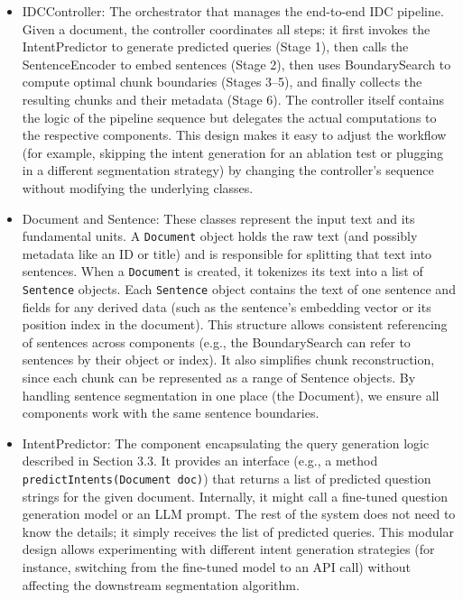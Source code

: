 \documentclass[12pt,a4paper]{report}
\begin{document}
\begin{itemize}
\item IDCController: The orchestrator that manages the end-to-end IDC pipeline. Given a document, the controller coordinates all steps: it first invokes the IntentPredictor to generate predicted queries (Stage 1), then calls the SentenceEncoder to embed sentences (Stage 2), then uses BoundarySearch to compute optimal chunk boundaries (Stages 3--5), and finally collects the resulting chunks and their metadata (Stage 6). The controller itself contains the logic of the pipeline sequence but delegates the actual computations to the respective components. This design makes it easy to adjust the workflow (for example, skipping the intent generation for an ablation test or plugging in a different segmentation strategy) by changing the controller's sequence without modifying the underlying classes.

\item Document and Sentence: These classes represent the input text and its fundamental units. A \texttt{Document} object holds the raw text (and possibly metadata like an ID or title) and is responsible for splitting that text into sentences. When a \texttt{Document} is created, it tokenizes its text into a list of \texttt{Sentence} objects. Each \texttt{Sentence} object contains the text of one sentence and fields for any derived data (such as the sentence's embedding vector or its position index in the document). This structure allows consistent referencing of sentences across components (e.g., the BoundarySearch can refer to sentences by their object or index). It also simplifies chunk reconstruction, since each chunk can be represented as a range of Sentence objects. By handling sentence segmentation in one place (the Document), we ensure all components work with the same sentence boundaries.

\item IntentPredictor: The component encapsulating the query generation logic described in Section 3.3. It provides an interface (e.g., a method \texttt{predictIntents(Document doc)}) that returns a list of predicted question strings for the given document. Internally, it might call a fine-tuned question generation model or an LLM prompt. The rest of the system does not need to know the details; it simply receives the list of predicted queries. This modular design allows experimenting with different intent generation strategies (for instance, switching from the fine-tuned model to an API call) without affecting the downstream segmentation algorithm.


\end{itemize}
\end{document}
